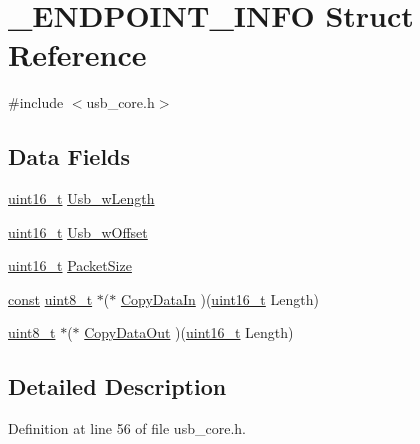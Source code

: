 \hypertarget{struct___e_n_d_p_o_i_n_t___i_n_f_o}{\section{\-\_\-\-E\-N\-D\-P\-O\-I\-N\-T\-\_\-\-I\-N\-F\-O Struct Reference}
\label{struct___e_n_d_p_o_i_n_t___i_n_f_o}
}


{\ttfamily \#include $<$usb\-\_\-core.\-h$>$}

\subsection*{Data Fields}
\begin{DoxyCompactItemize}
\item 
\hyperlink{stdint_8h_a273cf69d639a59973b6019625df33e30}{uint16\-\_\-t} \hyperlink{struct___e_n_d_p_o_i_n_t___i_n_f_o_a9d328b74992953d3fcacec35ae9fdac6}{Usb\-\_\-w\-Length}
\item 
\hyperlink{stdint_8h_a273cf69d639a59973b6019625df33e30}{uint16\-\_\-t} \hyperlink{struct___e_n_d_p_o_i_n_t___i_n_f_o_a4ba970c4d2750e7f6ddf1655dd06bf9e}{Usb\-\_\-w\-Offset}
\item 
\hyperlink{stdint_8h_a273cf69d639a59973b6019625df33e30}{uint16\-\_\-t} \hyperlink{struct___e_n_d_p_o_i_n_t___i_n_f_o_ab57c7650cc9f9043544e43aa168cf6fc}{Packet\-Size}
\item 
\hyperlink{group___n_a_m_e_ga7ae6d0e43244213b34de2c2b9aa30da6}{const} \hyperlink{stdint_8h_aba7bc1797add20fe3efdf37ced1182c5}{uint8\-\_\-t} $\ast$($\ast$ \hyperlink{struct___e_n_d_p_o_i_n_t___i_n_f_o_a14f4aec7173a623153f7b5ca9f5861ed}{Copy\-Data\-In} )(\hyperlink{stdint_8h_a273cf69d639a59973b6019625df33e30}{uint16\-\_\-t} Length)
\item 
\hyperlink{stdint_8h_aba7bc1797add20fe3efdf37ced1182c5}{uint8\-\_\-t} $\ast$($\ast$ \hyperlink{struct___e_n_d_p_o_i_n_t___i_n_f_o_a5172b5ab39fd9bb6dce3fe0c1dd86deb}{Copy\-Data\-Out} )(\hyperlink{stdint_8h_a273cf69d639a59973b6019625df33e30}{uint16\-\_\-t} Length)
\end{DoxyCompactItemize}


\subsection{Detailed Description}


Definition at line 56 of file usb\-\_\-core.\-h.



